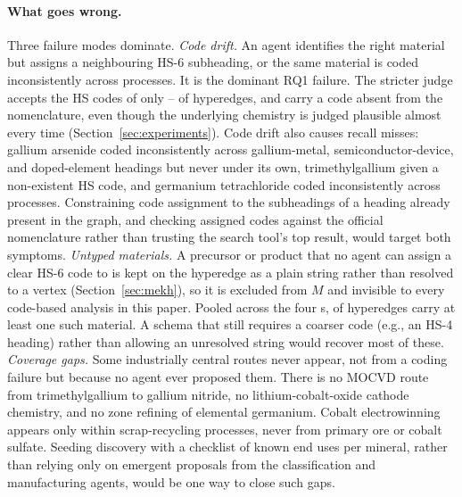 \paragraph{What goes wrong.}
Three failure modes dominate. \emph{Code drift.} An agent identifies the right material but assigns a neighbouring HS-6 subheading, or the same material is coded inconsistently across processes. It is the dominant RQ1 failure. The stricter judge accepts the HS codes of only \JudgeHSClaudeMin{}--\JudgeHSClaudeMax{} of hyperedges, and \HsInvalidEdgesAll{} carry a code absent from the nomenclature, even though the underlying chemistry is judged plausible almost every time (Section~\ref{sec:experiments}). Code drift also causes recall misses: gallium arsenide coded inconsistently across gallium-metal, semiconductor-device, and doped-element headings but never under its own, trimethylgallium given a non-existent HS code, and germanium tetrachloride coded inconsistently across processes. Constraining code assignment to the subheadings of a heading already present in the graph, and checking assigned codes against the official nomenclature rather than trusting the search tool's top result, would target both symptoms. \emph{Untyped materials.} A precursor or product that no agent can assign a clear HS-6 code to is kept on the hyperedge as a plain string rather than resolved to a vertex (Section~\ref{sec:mekh}), so it is excluded from $M$ and invisible to every code-based analysis in this paper. Pooled across the four \tool{}s, \MekhUntypedEdgesAll{} of \MekhProcessesAll{} hyperedges carry at least one such material. A schema that still requires a coarser code (e.g., an HS-4 heading) rather than allowing an unresolved string would recover most of these. \emph{Coverage gaps.} Some industrially central routes never appear, not from a coding failure but because no agent ever proposed them. There is no MOCVD route from trimethylgallium to gallium nitride, no lithium-cobalt-oxide cathode chemistry, and no zone refining of elemental germanium. Cobalt electrowinning appears only within scrap-recycling processes, never from primary ore or cobalt sulfate. Seeding discovery with a checklist of known end uses per mineral, rather than relying only on emergent proposals from the classification and manufacturing agents, would be one way to close such gaps.

